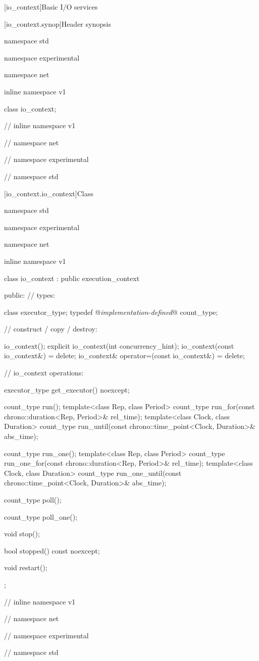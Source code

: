 
[io_context]{Basic I/O services}


%
[io_context.synop]{Header  synopsis}

\begin{codeblock}
namespace std {
namespace experimental {
namespace net {
inline namespace v1 {

  class io_context;

} // inline namespace v1
} // namespace net
} // namespace experimental
} // namespace std
\end{codeblock}



[io_context.io_context]{Class }

\begin{codeblock}
namespace std {
namespace experimental {
namespace net {
inline namespace v1 {

  class io_context : public execution_context
  {
  public:
    // types:

    class executor_type;
    typedef @\textit{implementation-defined}@ count_type;

    // construct / copy / destroy:

    io_context();
    explicit io_context(int concurrency_hint);
    io_context(const io_context&) = delete;
    io_context& operator=(const io_context&) = delete;

    // io_context operations:

    executor_type get_executor() noexcept;

    count_type run();
    template<class Rep, class Period>
      count_type run_for(const chrono::duration<Rep, Period>& rel_time);
    template<class Clock, class Duration>
      count_type run_until(const chrono::time_point<Clock, Duration>& abs_time);

    count_type run_one();
    template<class Rep, class Period>
      count_type run_one_for(const chrono::duration<Rep, Period>& rel_time);
    template<class Clock, class Duration>
      count_type run_one_until(const chrono::time_point<Clock, Duration>& abs_time);

    count_type poll();

    count_type poll_one();

    void stop();

    bool stopped() const noexcept;

    void restart();
  };

} // inline namespace v1
} // namespace net
} // namespace experimental
} // namespace std
\end{codeblock}

